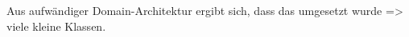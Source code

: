 









Aus aufwändiger Domain-Architektur ergibt sich, dass das umgesetzt wurde => viele kleine Klassen.








